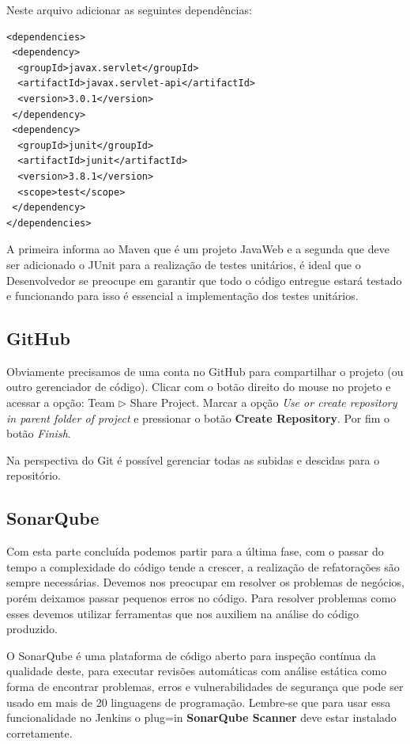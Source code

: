 \documentclass[a4paper,11pt]{article}
\begin{document}
Neste arquivo adicionar as seguintes dependências:
\begin{lstlisting}
<dependencies>
 <dependency>
  <groupId>javax.servlet</groupId>
  <artifactId>javax.servlet-api</artifactId>
  <version>3.0.1</version>
 </dependency>
 <dependency>
  <groupId>junit</groupId>
  <artifactId>junit</artifactId>
  <version>3.8.1</version>
  <scope>test</scope>
 </dependency>
</dependencies>
\end{lstlisting}

A primeira informa ao Maven que é um projeto JavaWeb e a segunda que deve ser adicionado o JUnit para a realização de testes unitários, é ideal que o Desenvolvedor se preocupe em garantir que todo o código entregue estará testado e funcionando para isso é essencial a implementação dos testes unitários.

\subsection{GitHub}
Obviamente precisamos de uma conta no GitHub para compartilhar o projeto (ou outro gerenciador de código). Clicar com o botão direito do mouse no projeto e acessar a opção: Team $\triangleright$ Share Project. Marcar a opção \textit{Use or create repository in parent folder of project} e pressionar o botão \textbf{Create Repository}. Por fim o botão \textit{Finish}.

Na perspectiva do Git é possível gerenciar todas as subidas e descidas para o repositório.

\subsection{SonarQube}
Com esta parte concluída podemos partir para a última fase, com o passar do tempo a complexidade do código tende a crescer, a realização de refatorações são sempre necessárias. Devemos nos preocupar em resolver os problemas de negócios, porém deixamos passar pequenos erros no código. Para resolver problemas como esses devemos utilizar ferramentas que nos auxiliem na análise do código produzido.

O SonarQube é uma plataforma de código aberto para inspeção contínua da qualidade deste, para executar revisões automáticas com análise estática como forma de encontrar problemas, erros e vulnerabilidades de segurança que pode ser usado em mais de 20 linguagens de programação. Lembre-se que para usar essa funcionalidade no Jenkins o plug=in \textbf{SonarQube Scanner} deve estar instalado corretamente.
\end{document}

